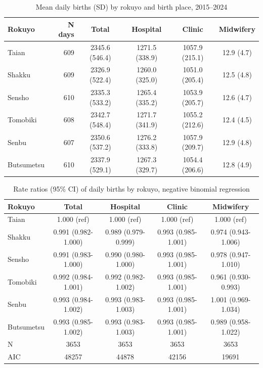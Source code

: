

\begin{table}[htbp]
\centering
\caption{Mean daily births (SD) by rokuyo and birth place, 2015--2024}
\label{tab:descriptive}
\begin{tabular}{lrcccc}
\toprule
Rokuyo & N days & Total & Hospital & Clinic & Midwifery \\
\midrule
Taian & 609 & 2345.6 (546.4) & 1271.5 (338.9) & 1057.9 (215.1) & 12.9 (4.7) \\
Shakku & 609 & 2326.9 (522.4) & 1260.0 (325.0) & 1051.0 (205.4) & 12.5 (4.8) \\
Sensho & 610 & 2335.3 (533.2) & 1265.4 (335.2) & 1053.9 (205.7) & 12.6 (4.7) \\
Tomobiki & 608 & 2342.7 (548.4) & 1271.7 (341.9) & 1055.2 (212.6) & 12.4 (4.5) \\
Senbu & 607 & 2350.6 (537.2) & 1276.2 (333.8) & 1057.9 (209.7) & 12.9 (4.8) \\
Butsumetsu & 610 & 2337.9 (529.1) & 1267.3 (329.7) & 1054.4 (206.6) & 12.8 (4.9) \\
\bottomrule
\end{tabular}
\end{table}


\begin{table}[htbp]
\centering
\caption{Rate ratios (95\% CI) of daily births by rokuyo, negative binomial regression}
\label{tab:main_analysis}
\begin{tabular}{lcccc}
\toprule
Rokuyo & Total & Hospital & Clinic & Midwifery \\
\midrule
Taian & 1.000 (ref) & 1.000 (ref) & 1.000 (ref) & 1.000 (ref) \\
Shakku & 0.991 (0.982-1.000) & 0.989 (0.979-0.999) & 0.993 (0.985-1.001) & 0.974 (0.943-1.006) \\
Sensho & 0.991 (0.983-1.000) & 0.990 (0.980-1.000) & 0.993 (0.985-1.001) & 0.978 (0.947-1.010) \\
Tomobiki & 0.992 (0.984-1.001) & 0.992 (0.982-1.002) & 0.993 (0.985-1.001) & 0.961 (0.930-0.993) \\
Senbu & 0.993 (0.984-1.002) & 0.993 (0.983-1.003) & 0.993 (0.985-1.001) & 1.001 (0.969-1.034) \\
Butsumetsu & 0.993 (0.985-1.002) & 0.993 (0.983-1.003) & 0.993 (0.985-1.001) & 0.989 (0.958-1.022) \\
\midrule
N & 3653 & 3653 & 3653 & 3653 \\
AIC & 48257 & 44878 & 42156 & 19691 \\
\bottomrule
\end{tabular}
\end{table}

